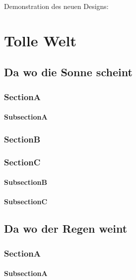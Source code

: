 \documentclass[ElegantBook]{Lilly}
\begin{document}
\begin{titlepage}
  \LillyLogo
  \hbox{}\vfill
    \begin{center}
        {\Huge Demonstration des neuen Designs: }\\
        \LARGE {}
    \end{center}
  \vfill\hbox{}
\end{titlepage}

\TableOfContents

\part{Tolle Welt}
\chapter{Da wo die Sonne scheint}
\printMiniToc
\section{SectionA}
\lipsum[1-2]
\subsection{SubsectionA}
\lipsum[2-4]
\clearpage
\section{SectionB}
\lipsum[6-8]
\section{SectionC}
\lipsum[1-2]
\subsection{SubsectionB}
\lipsum[1]
\subsection{SubsectionC}
\lipsum[2]

\chapter{Da wo der Regen weint}
\printMiniToc
\section{SectionA}
\lipsum[1-2]
\subsection{SubsectionA}
\lipsum[2-4]
\end{document}
